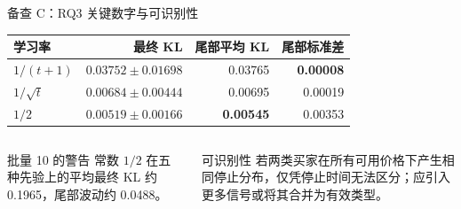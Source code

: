 \begin{frame}{备查 C：RQ3 关键数字与可识别性}
\begin{table}
\centering
\small
\begin{tabular}{lrrr}
\toprule
学习率 & 最终 KL & 尾部平均 KL & 尾部标准差\\
\midrule
$1/(t+1)$ & $0.03752\pm0.01698$ & 0.03765 & \textbf{0.00008}\\
$1/\sqrt t$ & $0.00684\pm0.00444$ & 0.00695 & 0.00019\\
$1/2$ & \textbf{$0.00519\pm0.00166$} & \textbf{0.00545} & 0.00353\\
\bottomrule
\end{tabular}
\end{table}
\begin{columns}[T,onlytextwidth]
\begin{block}{批量 10 的警告}
常数 $1/2$ 在五种先验上的平均最终 KL 约 0.1965，尾部波动约 0.0488。
\end{block}
\begin{alertblock}{可识别性}
若两类买家在所有可用价格下产生相同停止分布，仅凭停止时间无法区分；应引入更多信号或将其合并为有效类型。
\end{alertblock}
\end{columns}
\end{frame}
